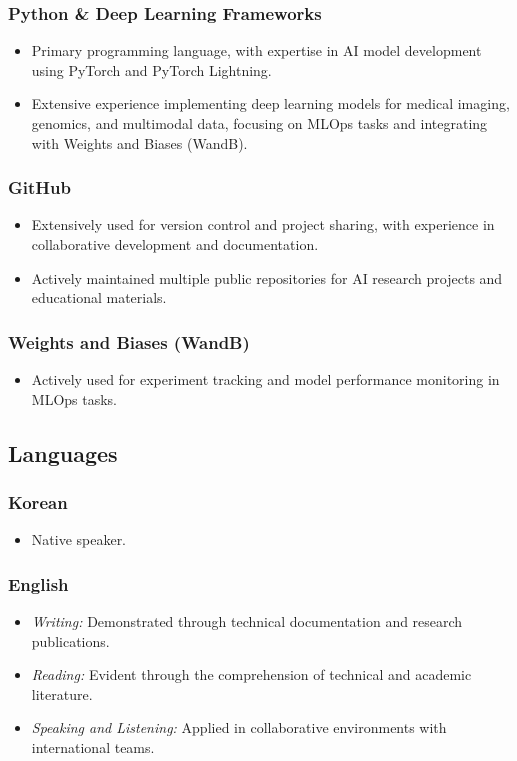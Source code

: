 \documentclass[11pt]{article}
\begin{document}
\subsubsection{Python \& Deep Learning Frameworks}
\begin{itemize}
    \item[\checkmark] Primary programming language, with expertise in AI model development using PyTorch and PyTorch Lightning.
    \item[\checkmark] Extensive experience implementing deep learning models for medical imaging, genomics, and multimodal data, focusing on MLOps tasks and integrating with Weights and Biases (WandB).
\end{itemize}
\subsubsection{GitHub}
\begin{itemize}
    \item[\checkmark] Extensively used for version control and project sharing, with experience in collaborative development and documentation.
    \item[\checkmark] Actively maintained multiple public repositories for AI research projects and educational materials.
\end{itemize}
\subsubsection{Weights and Biases (WandB)}
\begin{itemize}
    \item[\checkmark] Actively used for experiment tracking and model performance monitoring in MLOps tasks.
\end{itemize}
\subsection{Languages}
\subsubsection{Korean}
\begin{itemize}
    \item[\checkmark] Native speaker.
\end{itemize}
\subsubsection{English}
\begin{itemize}
    \item[\checkmark] \textit{Writing:} Demonstrated through technical documentation and research publications.
    \item[\checkmark] \textit{Reading:} Evident through the comprehension of technical and academic literature.
    \item[\checkmark] \textit{Speaking and Listening:} Applied in collaborative environments with international teams.
\end{itemize}
\end{document}
